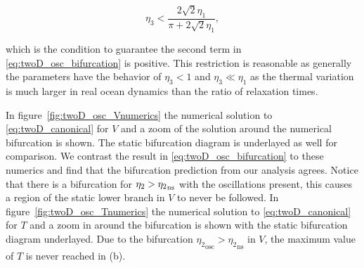 \begin{equation*}
\eta_3 <\frac{2\sqrt{2}\eta_1}{\pi+2\sqrt{2}\eta_1},
\end{equation*}

which is the condition to guarantee the second term in \eqref{eq:twoD_osc_bifurcation} is positive. This restriction is reasonable as generally the parameters have the behavior of $\eta_3<1$ and $\eta_3\ll \eta_1$ as the thermal variation is much larger in real ocean dynamics than the ratio of relaxation times.

\indent In figure~\ref{fig:twoD_osc_Vnumerics} the numerical solution to \eqref{eq:twoD_canonical} for $V$ and a zoom of the solution around the numerical bifurcation is shown. The static bifurcation diagram is underlayed as well for comparison. We contrast the result in \eqref{eq:twoD_osc_bifurcation} to these numerics and find that the bifurcation prediction from our analysis agrees. Notice that there is a bifurcation for $\eta_2>{\eta_2}_{\text{\text{ns}}}$ with the oscillations present, this causes a region of the static lower branch in $V$ to never be followed.
In figure~\ref{fig:twoD_osc_Tnumerics} the numerical solution to \eqref{eq:twoD_canonical} for $T$ and a zoom in around the bifurcation is shown with the static bifurcation diagram underlayed. Due to the bifurcation ${\eta_2}_{\text{osc}}>{\eta_2}_{\text{ns}}$ in $V$, the maximum value of $T$ is never reached in (b).

